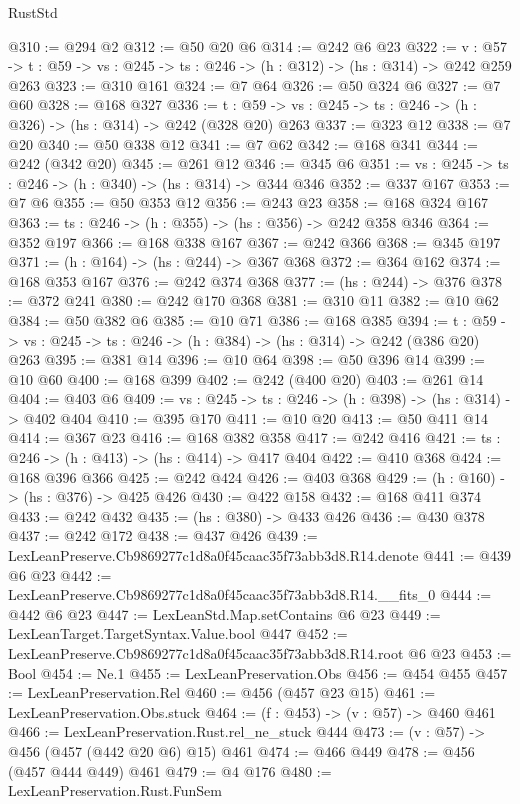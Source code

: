 \begin{lexlean}{RustStd}
\begin{coremodule}
@310 := @294 @2
@312 := @50 @20 @6
@314 := @242 @6 @23
@322 := {v : @57} ->
  {t : @59} -> {vs : @245} -> {ts : @246} -> (h : @312) -> (hs : @314) -> @242 @259 @263
@323 := @310 @161
@324 := @7 @64
@326 := @50 @324 @6
@327 := @7 @60
@328 := @168 @327
@336 := {t : @59} -> {vs : @245} -> {ts : @246} -> (h : @326) -> (hs : @314) -> @242 (@328 @20) @263
@337 := @323 @12
@338 := @7 @20
@340 := @50 @338 @12
@341 := @7 @62
@342 := @168 @341
@344 := @242 (@342 @20)
@345 := @261 @12
@346 := @345 @6
@351 := {vs : @245} -> {ts : @246} -> (h : @340) -> (hs : @314) -> @344 @346
@352 := @337 @167
@353 := @7 @6
@355 := @50 @353 @12
@356 := @243 @23
@358 := @168 @324 @167
@363 := {ts : @246} -> (h : @355) -> (hs : @356) -> @242 @358 @346
@364 := @352 @197
@366 := @168 @338 @167
@367 := @242 @366
@368 := @345 @197
@371 := (h : @164) -> (hs : @244) -> @367 @368
@372 := @364 @162
@374 := @168 @353 @167
@376 := @242 @374 @368
@377 := (hs : @244) -> @376
@378 := @372 @241
@380 := @242 @170 @368
@381 := @310 @11
@382 := @10 @62
@384 := @50 @382 @6
@385 := @10 @71
@386 := @168 @385
@394 := {t : @59} -> {vs : @245} -> {ts : @246} -> (h : @384) -> (hs : @314) -> @242 (@386 @20) @263
@395 := @381 @14
@396 := @10 @64
@398 := @50 @396 @14
@399 := @10 @60
@400 := @168 @399
@402 := @242 (@400 @20)
@403 := @261 @14
@404 := @403 @6
@409 := {vs : @245} -> {ts : @246} -> (h : @398) -> (hs : @314) -> @402 @404
@410 := @395 @170
@411 := @10 @20
@413 := @50 @411 @14
@414 := @367 @23
@416 := @168 @382 @358
@417 := @242 @416
@421 := {ts : @246} -> (h : @413) -> (hs : @414) -> @417 @404
@422 := @410 @368
@424 := @168 @396 @366
@425 := @242 @424
@426 := @403 @368
@429 := (h : @160) -> (hs : @376) -> @425 @426
@430 := @422 @158
@432 := @168 @411 @374
@433 := @242 @432
@435 := (hs : @380) -> @433 @426
@436 := @430 @378
@437 := @242 @172
@438 := @437 @426
@439 := LexLeanPreserve.Cb9869277c1d8a0f45caac35f73abb3d8.R14.denote
@441 := @439 @6 @23
@442 := LexLeanPreserve.Cb9869277c1d8a0f45caac35f73abb3d8.R14.__fits_0
@444 := @442 @6 @23
@447 := LexLeanStd.Map.setContains @6 @23
@449 := LexLeanTarget.TargetSyntax.Value.bool @447
@452 := LexLeanPreserve.Cb9869277c1d8a0f45caac35f73abb3d8.R14.root @6 @23
@453 := Bool
@454 := Ne.{1}
@455 := LexLeanPreservation.Obs
@456 := @454 @455
@457 := LexLeanPreservation.Rel
@460 := @456 (@457 @23 @15)
@461 := LexLeanPreservation.Obs.stuck
@464 := (f : @453) -> (v : @57) -> @460 @461
@466 := LexLeanPreservation.Rust.rel_ne_stuck @444
@473 := (v : @57) -> @456 (@457 (@442 @20 @6) @15) @461
@474 := @466 @449
@478 := @456 (@457 @444 @449) @461
@479 := @4 @176
@480 := LexLeanPreservation.Rust.FunSem

\end{coremodule}
\end{lexlean}
